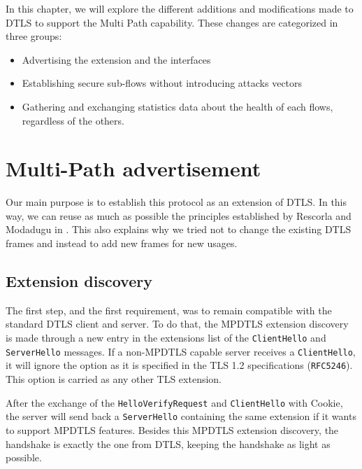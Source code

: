 \documentclass[11pt,a4paper,oldfontcommands]{memoir}
\begin{document}
In this chapter, we will explore the different additions and modifications made to DTLS to support the Multi Path capability. These changes are categorized in three groups:
\begin{itemize}
\item Advertising the extension and the interfaces
\item Establishing secure sub-flows without introducing attacks vectors
\item Gathering and exchanging statistics data about the health of each flows, regardless of the others. 
\end{itemize}


\section{Multi-Path advertisement}

Our main purpose is to establish this protocol as an extension of DTLS. In this way, we can reuse as much as possible the principles established by Rescorla and Modadugu in \cite{modadugu2004design}. This also explains why we tried not to change the existing DTLS frames and instead to add new frames for new usages.

\subsection{Extension discovery}

The first step, and the first requirement, was to remain compatible with the standard DTLS client and server. To do that, the MPDTLS extension discovery is made through a new entry in the extensions list of the \verb!ClientHello! and \verb!ServerHello! messages. If a non-MPDTLS capable server receives a \verb!ClientHello!, it will ignore the option  as it is specified in the TLS 1.2 specifications (\verb!RFC5246!\cite{rfc5246}). This option is carried as any other TLS extension.


After the exchange of the \verb!HelloVerifyRequest! and \verb!ClientHello! with Cookie, the server will send back a \verb!ServerHello! containing the same extension if it wants to support MPDTLS features. Besides this MPDTLS extension discovery, the handshake is exactly the one from DTLS, keeping the handshake as light as possible.
\end{document}
